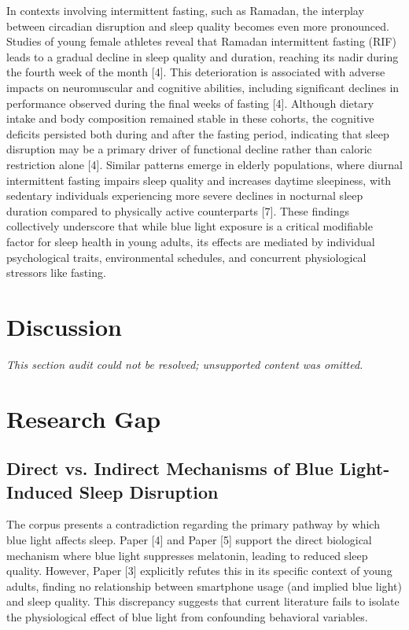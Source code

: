 \documentclass[conference]{IEEEtran}
\begin{document}
In contexts involving intermittent fasting, such as Ramadan, the interplay between circadian disruption and sleep quality becomes even more pronounced. Studies of young female athletes reveal that Ramadan intermittent fasting (RIF) leads to a gradual decline in sleep quality and duration, reaching its nadir during the fourth week of the month [4]. This deterioration is associated with adverse impacts on neuromuscular and cognitive abilities, including significant declines in performance observed during the final weeks of fasting [4]. Although dietary intake and body composition remained stable in these cohorts, the cognitive deficits persisted both during and after the fasting period, indicating that sleep disruption may be a primary driver of functional decline rather than caloric restriction alone [4]. Similar patterns emerge in elderly populations, where diurnal intermittent fasting impairs sleep quality and increases daytime sleepiness, with sedentary individuals experiencing more severe declines in nocturnal sleep duration compared to physically active counterparts [7]. These findings collectively underscore that while blue light exposure is a critical modifiable factor for sleep health in young adults, its effects are mediated by individual psychological traits, environmental schedules, and concurrent physiological stressors like fasting.

\section{Discussion}
\textit{This section audit could not be resolved; unsupported content was omitted.}

\section{Research Gap}
\subsection{Direct vs. Indirect Mechanisms of Blue Light-Induced Sleep Disruption}
The corpus presents a contradiction regarding the primary pathway by which blue light affects sleep. Paper [4] and Paper [5] support the direct biological mechanism where blue light suppresses melatonin, leading to reduced sleep quality. However, Paper [3] explicitly refutes this in its specific context of young adults, finding no relationship between smartphone usage (and implied blue light) and sleep quality. This discrepancy suggests that current literature fails to isolate the physiological effect of blue light from confounding behavioral variables.
\end{document}
